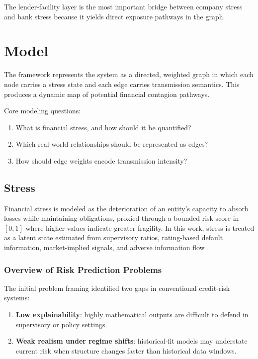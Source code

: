 The lender-facility layer is the most important bridge between company stress and bank stress because it yields direct exposure pathways in the graph.

\section{Model}

The framework represents the system as a directed, weighted graph in which each node carries a stress state and each edge carries transmission semantics. This produces a dynamic map of potential financial contagion pathways.

Core modeling questions:

\begin{enumerate}
  \item What is financial stress, and how should it be quantified?
  \item Which real-world relationships should be represented as edges?
  \item How should edge weights encode transmission intensity?
\end{enumerate}

\subsection{Stress}

Financial stress is modeled as the deterioration of an entity's capacity to absorb losses while maintaining obligations, proxied through a bounded risk score in $[0,1]$ where higher values indicate greater fragility. In this work, stress is treated as a latent state estimated from supervisory ratios, rating-based default information, market-implied signals, and adverse information flow \cite{ref6} \cite{ref7}.

\subsubsection{Overview of Risk Prediction Problems}

The initial problem framing identified two gaps in conventional credit-risk systems:

\begin{enumerate}
  \item \textbf{Low explainability}: highly mathematical outputs are difficult to defend in supervisory or policy settings.
  \item \textbf{Weak realism under regime shifts}: historical-fit models may understate current risk when structure changes faster than historical data windows.
\end{enumerate}

